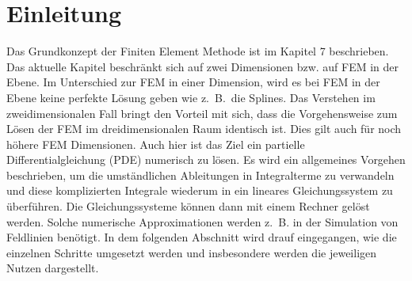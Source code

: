 %
%
%
\section{Einleitung\label{fem:section:einleitung}}
Das Grundkonzept der Finiten Element Methode ist im Kapitel 7
beschrieben. Das aktuelle Kapitel beschränkt sich auf zwei Dimensionen
bzw. auf FEM in der Ebene.
Im Unterschied zur FEM in einer Dimension,
wird es bei FEM in der Ebene keine perfekte Lösung geben wie z.~B.~die
Splines.
Das Verstehen im zweidimensionalen Fall bringt den
Vorteil mit sich, dass die Vorgehensweise zum Lösen der FEM im
dreidimensionalen Raum identisch ist.
Dies gilt auch für noch höhere
FEM Dimensionen.
Auch hier ist das Ziel ein partielle Differentialgleichung
(PDE) numerisch zu lösen.
%
%
Es wird ein allgemeines Vorgehen beschrieben,
um die umständlichen Ableitungen in Integralterme zu verwandeln und
diese komplizierten Integrale wiederum in ein lineares Gleichungssystem
zu überführen.
Die Gleichungssysteme können dann mit einem Rechner
gelöst  werden.
Solche numerische Approximationen werden z.~B. in
der Simulation von Feldlinien benötigt.
%
%
In dem folgenden Abschnitt wird drauf eingegangen, wie die einzelnen
Schritte umgesetzt werden und insbesondere werden die jeweiligen Nutzen
dargestellt.

